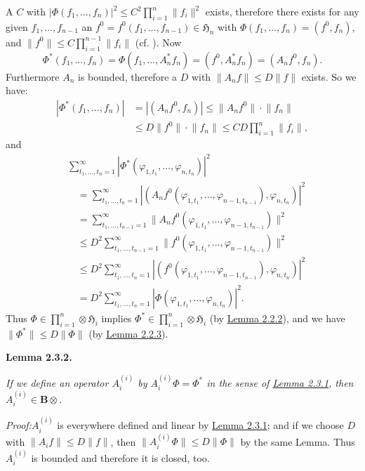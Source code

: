 \documentclass[12pt,b5paper,twoside]{article}
\newcommand{\Hspace}{\mathfrak H}
\newcommand{\B}{\mathbf B}
\newcommand{\Lemma}[1]{%
  \par\smallskip\noindent\phantomsection\label{lem:#1}\textbf{Lemma #1.}\enspace
}
\newcommand{\Proof}{\par\noindent\textit{Proof:}\enspace}
\newcommand{\lemref}[1]{\hyperref[lem:#1]{Lemma #1}}
\begin{document}
A $C$ with
$|\Phi(f_1,\ldots,f_n)|^2\leq C^2\prod_{i=1}^{n}\lVert f_i\rVert^2$ exists,
therefore there exists for any given $f_1,\ldots,f_{n-1}$ an
$f^0=f^0(f_1,\ldots,f_{n-1})\in\Hspace_n$ with
$\Phi(f_1,\ldots,f_n)=(f^0,f_n)$, and
$\lVert f^0\rVert\leq C\prod_{i=1}^{n-1}\lVert f_i\rVert$ (cf.
\cite[p.~94]{ref16}). Now
\[
 \Phi^*(f_1,\ldots,f_n)
 =\Phi(f_1,\ldots,A_n^*f_n)
 =(f^0,A_n^*f_n)=(A_nf^0,f_n).
\]
Furthermore $A_n$ is bounded, therefore a $D$ with
$\lVert A_nf\rVert\leq D\lVert f\rVert$ exists. So we have:
\begin{align*}
 |\Phi^*(f_1,\ldots,f_n)|
 &=|(A_nf^0,f_n)|
 \leq\lVert A_nf^0\rVert\cdot\lVert f_n\rVert\\
 &\leq D\lVert f^0\rVert\cdot\lVert f_n\rVert
 \leq CD\prod_{i=1}^{n}\lVert f_i\rVert,
\end{align*}
and
\begin{align*}
 &\sum_{t_1,\ldots,t_n=1}^{\infty}
   |\Phi^*(\varphi_{1,t_1},\ldots,\varphi_{n,t_n})|^2\\
 &\quad=\sum_{t_1,\ldots,t_n=1}^{\infty}
   |(A_nf^0(\varphi_{1,t_1},\ldots,\varphi_{n-1,t_{n-1}}),
      \varphi_{n,t_n})|^2\\
 &\quad=\sum_{t_1,\ldots,t_{n-1}=1}^{\infty}
   \lVert A_nf^0(\varphi_{1,t_1},\ldots,
                    \varphi_{n-1,t_{n-1}})\rVert^2\\
 &\quad\leq D^2\sum_{t_1,\ldots,t_{n-1}=1}^{\infty}
   \lVert f^0(\varphi_{1,t_1},\ldots,
               \varphi_{n-1,t_{n-1}})\rVert^2\\
 &\quad\leq D^2\sum_{t_1,\ldots,t_n=1}^{\infty}
   |(f^0(\varphi_{1,t_1},\ldots,\varphi_{n-1,t_{n-1}}),
      \varphi_{n,t_n})|^2\\
 &\quad=D^2\sum_{t_1,\ldots,t_n=1}^{\infty}
   |\Phi(\varphi_{1,t_1},\ldots,\varphi_{n,t_n})|^2.
\end{align*}
Thus $\Phi\in\prod_{i=1}^{n}\otimes\Hspace_i$ implies
$\Phi^*\in\prod_{i=1}^{n}\otimes\Hspace_i$ (by \lemref{2.2.2}), and we
have $\lVert\Phi^*\rVert\leq D\lVert\Phi\rVert$ (by \lemref{2.2.3}).

\Lemma{2.3.2}
{\itshape
If we define an operator $A_i^{(i)}$ by $A_i^{(i)}\Phi=\Phi^*$ in the sense
of \lemref{2.3.1}, then $A_i^{(i)}\in\B\otimes$.}

\Proof $A_i^{(i)}$ is everywhere defined and linear by \lemref{2.3.1}; and
if we choose $D$ with $\lVert A_if\rVert\leq D\lVert f\rVert$, then
$\lVert A_i^{(i)}\Phi\rVert\leq D\lVert\Phi\rVert$ by the same Lemma. Thus
$A_i^{(i)}$ is bounded and therefore it is closed, too.
\end{document}
